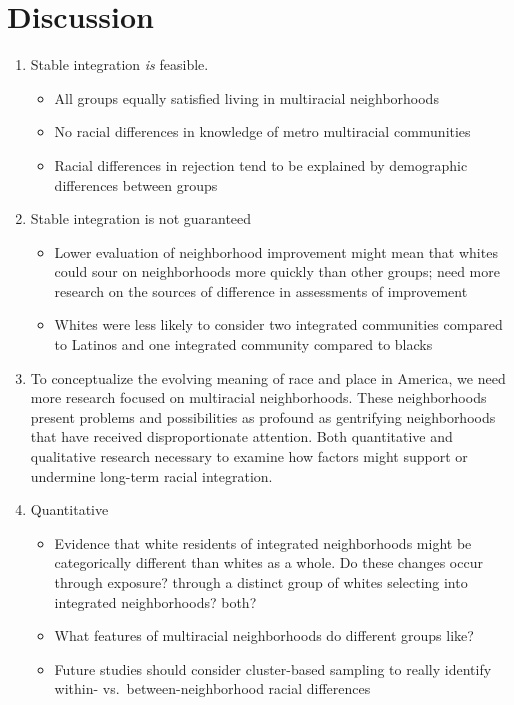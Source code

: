 \documentclass{baderart}
\begin{document}
\section{Discussion}

\begin{enumerate}
\item Stable integration \emph{is} feasible.
\begin{itemize}
\item All groups equally satisfied living in multiracial neighborhoods
\item No racial differences in knowledge of metro multiracial communities
\item Racial differences in rejection tend to be explained by demographic differences between groups
\end{itemize}

\item Stable integration is not guaranteed
\begin{itemize}
\item Lower evaluation of neighborhood improvement might mean that whites could sour on neighborhoods more quickly than other groups; need more research on the sources of difference in assessments of improvement
\item Whites were less likely to consider two integrated communities compared to Latinos and one integrated community compared to blacks
\end{itemize}

\item To conceptualize the evolving meaning of race and place in America, we need more research focused on multiracial neighborhoods. These neighborhoods present problems and possibilities as profound as gentrifying neighborhoods that have received disproportionate attention. Both quantitative and qualitative research necessary to examine how factors might support or undermine long-term racial integration. 

\item Quantitative 
\begin{itemize}
\item Evidence that white residents of integrated neighborhoods might be categorically different than whites as a whole. Do these changes occur through exposure? through a distinct group of whites selecting into integrated neighborhoods? both?
\item What features of multiracial neighborhoods do different groups like?
\item Future studies should consider cluster-based sampling to really identify within- vs.\ between-neighborhood racial differences
\end{itemize}


\end{enumerate}
\end{document}
